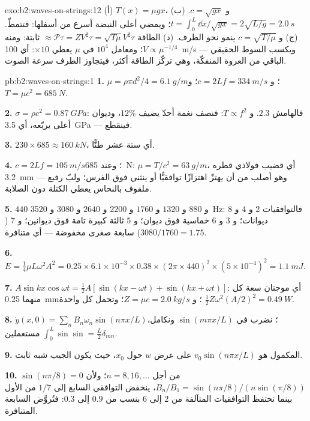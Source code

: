 \begin{solution}{exo:b2:waves-on-strings:12}
(أ) $T(x) = \mu gx$، و $c = \sqrt{gx}$. (ب) $t = \int_0^L\dd x/\sqrt{gx} = 2\sqrt{L/g} =
\qty{2.0}{s}$؛ ويمضي أعلى النبضة أسرع من أسفلها: فتتمطّ.
(ج) و $c = \sqrt{T/\mu}$ ينمو نحو الطرف. (د) الطاقة $\approx
\mathcal P\tau = ZV^2\tau = \sqrt{T\mu}V^2\tau$ ثابتة: ومنه $V \propto \mu^{-1/4}$؛ ومعامل
$10^4$ في $\mu$ يعطي $\times10$: أي \qty{100}{m/s} --- ويكسب السوط الحقيقي
الباقي من العروة المنفكّة، وهي تركّز الطاقة أكثر،
فيتجاوز الطرف سرعة الصوت.
\end{solution}

\begin{solution}{pb:b2:waves-on-strings:1}
\textbf{1.} $\mu = \rho\pi d^2/4 = \qty{6.1}{g/m}$؛ و $c = 2Lf = \qty{334}{m/s}$؛ و $T = \mu c^2
= \qty{685}{N}$.

\textbf{2.} $\sigma = \rho c^2 = \qty{0.87}{GPa}$: فالهامش $2.3$. و $T \propto f^2$: فنصف
نغمة أحدّ يضيف $12\%$، وديوان أعلى يربّعه، أي
\qty{3.5}{GPa} --- فينقطع.

\textbf{3.} $230 \times 685 \approx \qty{160}{kN}$، أي ستة عشر طنًّا.

\textbf{4.} $c = 2Lf = \qty{105}{m/s}$؛ وعند \qty{685}{N}: $\mu = T/c^2 = \qty{63}{g/m}$،
أي قضيب فولاذي قطره \qty{3.2}{mm} --- وهو أصلب من أن يهتزّ
اهتزازًا توافقيًّا أو ينثني فوق الفرس؛ ولبّ رفيع ملفوف بالنحاس
يعطي الكتلة دون الصلابة.

\textbf{5.} $440$ و $880$ و $1320$ و $1760$ و $2200$ و $2640$ و $3080$ و \qty{3520}{Hz}: فالتوافقيات $2$
و $4$ و $8$ ديوانات؛ و $3$ و $6$ خماسية فوق ديوان؛ و $5$ ثالثة كبيرة
تامة فوق ديوانين؛ و $7$ ($3080/1760 = 1.75$) سابعة صغرى
مخفوضة --- أي متنافرة.

\textbf{6.} $E = \tfrac14\mu L\omega^2A^2 = 0.25 \times 6.1 \times 10^{-3} \times 0.38 \times (2\pi
\times 440)^2 \times (5 \times 10^{-4})^2 = \qty{1.1}{mJ}$.

\textbf{7.} $A\sin kx\cos\omega t = \tfrac12A[\sin(kx - \omega t) + \sin(kx + \omega t)]$: أي موجتان
سعة كل منهما \qty{0.25}{mm}؛ و $Z = \mu c = \qty{2.0}{kg/s}$؛ وتحمل كل واحدة
$\tfrac12Z\omega^2(A/2)^2 = \qty{0.49}{W}$.

\textbf{8.} $\dot y(x, 0) = \sum_nB_n\omega_n\sin(n\pi x/L)$؛ نضرب في
$\sin(m\pi x/L)$ ونكامل، مستعملين $\int_0^L\sin\sin = \tfrac L2\delta_{mn}$.

\textbf{9.} المكمول هو $v_0\sin(n\pi x/L)$ على عرض $w$ حول $x_0$،
حيث يكون الجيب شبه ثابت.

\textbf{10.} $\sin(n\pi/8) = 0$ من أجل $n = 8, 16, \dots$؛ ولأن $B_n/B_1 =
\sin(n\pi/8)/(n\sin(\pi/8))$، ينخفض التوافقي السابع إلى $1/7$ من
الأول بينما تحتفظ التوافقيات المتآلفة من $2$ إلى $6$ بنسب من $0.9$ إلى $0.3$: فتُروَّض
السابعة المتنافرة.


\end{solution}
